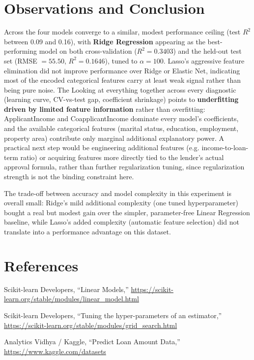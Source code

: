 \documentclass[12pt,a4paper]{article}
\begin{document}
\section{Observations and Conclusion}
Across the four models converge to a similar, modest performance ceiling (test $R^2$ between 0.09
and 0.16), with \textbf{Ridge Regression} appearing as the best-performing model on both
cross-validation ($R^2=0.3403$) and the held-out test set (RMSE $=55.50$, $R^2=0.1646$),
tuned to $\alpha=100$. Lasso's aggressive feature elimination did not improve performance
over Ridge or Elastic Net, indicating most of the encoded categorical features carry at least
weak signal rather than being pure noise. The Looking at everything together across every diagnostic
(learning curve, CV-vs-test gap, coefficient shrinkage) points to \textbf{underfitting driven
by limited feature information} rather than overfitting: ApplicantIncome and
CoapplicantIncome dominate every model's coefficients, and the available categorical
features (marital status, education, employment, property area) contribute only marginal
additional explanatory power. A practical next step would be engineering additional
features (e.g. income-to-loan-term ratio) or acquiring features more directly tied to the
lender's actual approval formula, rather than further regularization tuning, since
regularization strength is not the binding constraint here.

The trade-off between accuracy and model complexity in this experiment is overall small:
Ridge's mild additional complexity (one tuned hyperparameter) bought a real but modest gain
over the simpler, parameter-free Linear Regression baseline, while Lasso's added complexity
(automatic feature selection) did not translate into a performance advantage on this dataset.

\section{References}
\begin{enumerate}[label={[\arabic*]}]
\item Scikit-learn Developers, ``Linear Models,'' \url{https://scikit-learn.org/stable/modules/linear_model.html}
\item Scikit-learn Developers, ``Tuning the hyper-parameters of an estimator,'' \url{https://scikit-learn.org/stable/modules/grid_search.html}
\item Analytics Vidhya / Kaggle, ``Predict Loan Amount Data,'' \url{https://www.kaggle.com/datasets}
\end{enumerate}
\end{document}
